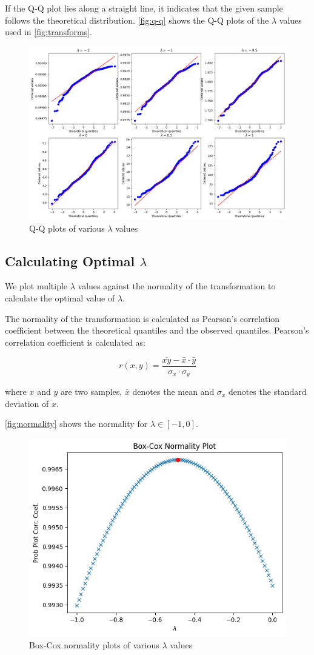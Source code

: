 If the Q-Q plot lies along a straight line, it indicates that the given sample follows the theoretical distribution.
\autoref{fig:q-q} shows the Q-Q plots of the $\lambda$ values used in \autoref{fig:transforms}.

\begin{figure}[!ht]
  \centering
  \includegraphics[width=\textwidth]{images/q-q.png}
  \caption{Q-Q plots of various $\lambda$ values}
  \label{fig:q-q}
\end{figure}


\subsection{Calculating Optimal $\lambda$}

We plot multiple $\lambda$ values against the normality of the transformation to calculate the optimal value of $\lambda$.

The normality of the transformation is calculated as Pearson's correlation coefficient between the theoretical quantiles and the observed quantiles.
Pearson's correlation coefficient is calculated as:

\[ r(x, y) = \frac{\overline{xy} - \bar{x} \cdot \bar{y}}{\sigma_x \cdot \sigma_y} \]

\noindent where $x$ and $y$ are two samples, $\bar{x}$ denotes the mean and $\sigma_x$ denotes the standard deviation of $x$.

\autoref{fig:normality} shows the normality for $\lambda \in [-1, 0]$.

\begin{figure}[!ht]
  \centering
  \includegraphics[width=.6\textwidth]{images/normality.png}
  \caption{Box-Cox normality plots of various $\lambda$ values}
  \label{fig:normality}
\end{figure}

